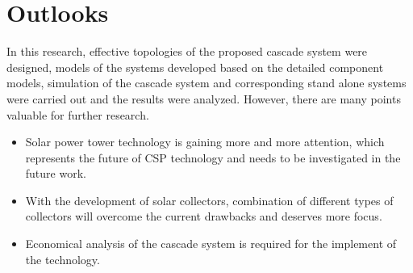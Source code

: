 \section{Outlooks}
In this research, effective topologies of the proposed cascade system were designed, models of the systems developed based on the detailed component models, simulation of the cascade system and corresponding stand alone systems were carried out and the results were analyzed. However, there are many points valuable for further research.
\begin{itemize}
  \item Solar power tower technology is gaining more and more attention, which represents the future of CSP technology and needs to be investigated in the future work. 
  \item With the development of solar collectors, combination of different types of collectors will overcome the current drawbacks and deserves more focus.
  \item Economical analysis of the cascade system is required for the implement of the technology.
\end{itemize}